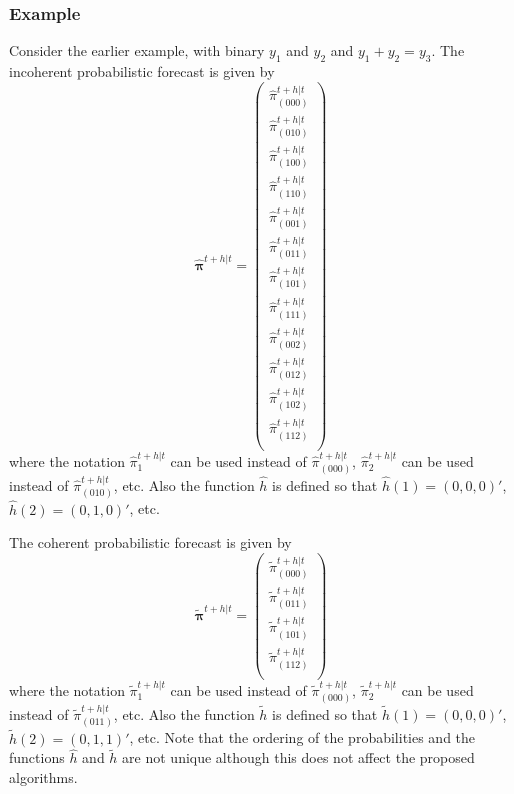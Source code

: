 \documentclass[a4paper,review,12pt,authoryear]{elsarticle}
\newcommand{\bpi}{\bm{\pi}}
\begin{document}
    \subsubsection*{Example}
    
    Consider the earlier example, with binary $y_1$ and $y_2$ and $y_1+y_2=y_3$. The incoherent probabilistic forecast is given by
    \[
      \hat{\bpi}^{t+h|t}=\begin{pmatrix}
         \hat{\pi}^{t+h|t}_{(000)}\\
         \hat{\pi}^{t+h|t}_{(010)}\\
         \hat{\pi}^{t+h|t}_{(100)}\\
         \hat{\pi}^{t+h|t}_{(110)}\\
         \hat{\pi}^{t+h|t}_{(001)}\\
         \hat{\pi}^{t+h|t}_{(011)}\\
         \hat{\pi}^{t+h|t}_{(101)}\\
         \hat{\pi}^{t+h|t}_{(111)}\\
         \hat{\pi}^{t+h|t}_{(002)}\\
         \hat{\pi}^{t+h|t}_{(012)}\\
         \hat{\pi}^{t+h|t}_{(102)}\\
         \hat{\pi}^{t+h|t}_{(112)}\\
      \end{pmatrix}
    \]
    where the notation $\hat{\pi}^{t+h|t}_{1}$ can be used instead of $\hat{\pi}^{t+h|t}_{(000)}$, $\hat{\pi}^{t+h|t}_{2}$ can be used instead of $\hat{\pi}^{t+h|t}_{(010)}$, etc. Also the function $\hat{h}$ is defined so that $\hat{h}(1)=(0,0,0)'$, $\hat{h}(2)=(0,1,0)'$, etc.
    
    The coherent probabilistic forecast is given by
    \[
    \tilde{\bpi}^{t+h|t}=\begin{pmatrix}
    \tilde{\pi}^{t+h|t}_{(000)}\\
    \tilde{\pi}^{t+h|t}_{(011)}\\
    \tilde{\pi}^{t+h|t}_{(101)}\\
    \tilde{\pi}^{t+h|t}_{(112)}\\
    \end{pmatrix}
    \]
    where the notation $\tilde{\pi}^{t+h|t}_{1}$ can be used instead of $\tilde{\pi}^{t+h|t}_{(000)}$, $\tilde{\pi}^{t+h|t}_{2}$ can be used instead of $\tilde{\pi}^{t+h|t}_{(011)}$, etc. Also the function $\tilde{h}$ is defined so that $\tilde{h}(1)=(0,0,0)'$, $\tilde{h}(2)=(0,1,1)'$, etc. Note that the ordering of the probabilities and the functions $\hat{h}$ and $\tilde{h}$ are not unique although this does not affect the proposed algorithms.
    
\end{document}
